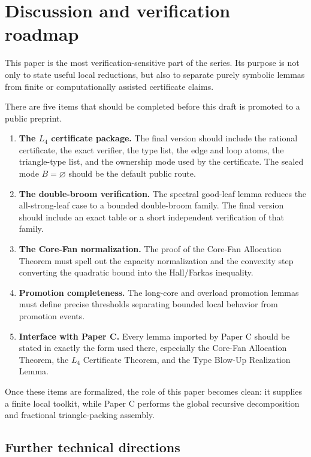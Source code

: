 \documentclass[11pt]{article}
\theoremstyle{definition}
\begin{document}
\section{Discussion and verification roadmap}

This paper is the most verification-sensitive part of the series. Its purpose is not only to state useful local reductions, but also to separate purely symbolic lemmas from finite or computationally assisted certificate claims.

There are five items that should be completed before this draft is promoted to a public preprint.

\begin{enumerate}[label=(\roman*)]
    \item \textbf{The \(L_4\) certificate package.} The final version should include the rational certificate, the exact verifier, the type list, the edge and loop atoms, the triangle-type list, and the ownership mode used by the certificate. The sealed mode \(B=\varnothing\) should be the default public route.
    \item \textbf{The double-broom verification.} The spectral good-leaf lemma reduces the all-strong-leaf case to a bounded double-broom family. The final version should include an exact table or a short independent verification of that family.
    \item \textbf{The Core-Fan normalization.} The proof of the Core-Fan Allocation Theorem must spell out the capacity normalization and the convexity step converting the quadratic bound into the Hall/Farkas inequality.
    \item \textbf{Promotion completeness.} The long-core and overload promotion lemmas must define precise thresholds separating bounded local behavior from promotion events.
    \item \textbf{Interface with Paper C.} Every lemma imported by Paper C should be stated in exactly the form used there, especially the Core-Fan Allocation Theorem, the \(L_4\) Certificate Theorem, and the Type Blow-Up Realization Lemma.
\end{enumerate}

Once these items are formalized, the role of this paper becomes clean: it supplies a finite local toolkit, while Paper C performs the global recursive decomposition and fractional triangle-packing assembly.

\subsection*{Further technical directions}
\end{document}
